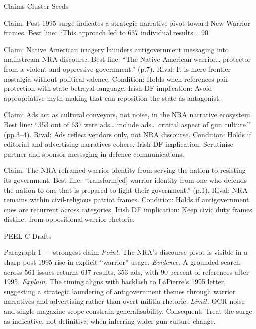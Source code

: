 Claims-Cluster Seeds

Claim: Post-1995 surge indicates a strategic narrative pivot toward New Warrior frames. Best line: “This approach led to 637 individual results... 90%

Claim: Native American imagery launders antigovernment messaging into mainstream NRA discourse. Best line: “The Native American warrior… protector from a violent and oppressive government.” (p.7). Rival: It is mere frontier nostalgia without political valence. Condition: Holds when references pair protection with state betrayal language. Irish DF implication: Avoid appropriative myth-making that can reposition the state as antagonist.

Claim: Ads act as cultural conveyors, not noise, in the NRA narrative ecosystem. Best line: “353 out of 637 were ads… include ads… critical aspect of gun culture.” (pp.3–4). Rival: Ads reflect vendors only, not NRA discourse. Condition: Holds if editorial and advertising narratives cohere. Irish DF implication: Scrutinise partner and sponsor messaging in defence communications.

Claim: The NRA reframed warrior identity from serving the nation to resisting its government. Best line: “transform[ed] warrior identity from one who defends the nation to one that is prepared to fight their government.” (p.1). Rival: NRA remains within civil-religious patriot frames. Condition: Holds if antigovernment cues are recurrent across categories. Irish DF implication: Keep civic duty frames distinct from oppositional warrior rhetoric.

PEEL-C Drafts

Paragraph 1 — strongest claim
\textit{Point.} The NRA’s discourse pivot is visible in a sharp post-1995 rise in explicit “warrior” usage.
\textit{Evidence.} A grounded search across 561 issues returns 637 results, 353 ads, with 90 percent of references after 1995.
\textit{Explain.} The timing aligns with backlash to LaPierre’s 1995 letter, suggesting a strategic laundering of antigovernment themes through warrior narratives and advertising rather than overt militia rhetoric.
\textit{Limit.} OCR noise and single-magazine scope constrain generalisability. Consequent: Treat the surge as indicative, not definitive, when inferring wider gun-culture change.

